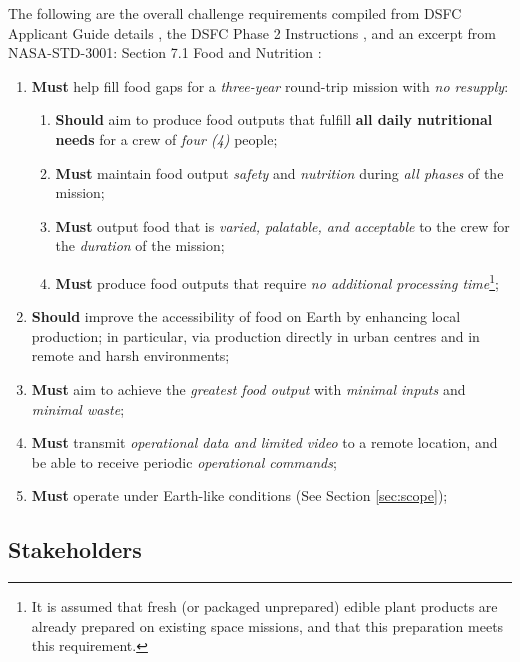 \documentclass{../tex/report}
\begin{document}
The following are the overall challenge requirements compiled from DSFC Applicant Guide details \cite{applicantguide}, the DSFC Phase 2 Instructions \cite{dsfc-phase2}, and an excerpt from NASA-STD-3001: Section 7.1 Food and Nutrition \cite{nutrition}:
\begin{enumerate}[label=R\arabic*., ref=R\arabic*]
    \item \label{r:1} \textbf{Must} help fill food gaps for a \textit{three-year} round-trip mission with \textit{no resupply}:
    \begin{enumerate}[ref=R1\alph*]
        \item \label{r:1a} \textbf{Should} aim to produce food outputs that fulfill \textbf{all daily nutritional needs} for a crew of \textit{four (4)} people;
        \item \label{r:1b} \textbf{Must} maintain food output \textit{safety} and \textit{nutrition} during \textit{all phases} of the mission;
        \item \label{r:1c} \textbf{Must} output food that is \textit{varied, palatable, and acceptable} to the crew for the \textit{duration} of the mission;
        \item \label{r:1d} \textbf{Must} produce food outputs that require \textit{no additional processing 
        time}\footnote{It is assumed that fresh (or packaged unprepared) edible plant products are already prepared on existing space missions, and that this preparation meets this requirement.};
    \end{enumerate}
    \item \label{r:2} \textbf{Should} improve the accessibility of food on Earth by enhancing local production; in particular, via production directly in urban centres and in remote and harsh environments;
    \item \label{r:3} \textbf{Must} aim to achieve the \textit{greatest food output} with \textit{minimal inputs} and \textit{minimal waste};
    \item \label{r:4} \textbf{Must} transmit \textit{operational data and limited video} to a remote location, and be able to receive periodic \textit{operational commands};
    \item \label{r:5} \textbf{Must} operate under Earth-like conditions (See Section \ref{sec:scope});
\end{enumerate}


\subsection{Stakeholders}
\label{sec:stakeholders}
\end{document}
